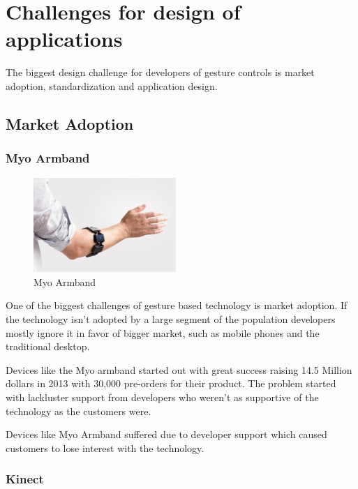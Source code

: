 \chapter{Challenges for design of applications}

The biggest design challenge for developers of gesture controls is market adoption, standardization and application design.

\section{Market Adoption}

\subsection{Myo Armband}

\begin{figure}
  \begin{center}
    \includegraphics[width=0.48\textwidth]{img/myo.jpg}
  \end{center}
  \caption{Myo Armband}
\end{figure}

One of the biggest challenges of gesture based technology is market adoption. If the technology isn't adopted by a large segment of the population developers mostly ignore it in favor of bigger market, such as mobile phones and the traditional desktop.

Devices like the Myo armband started out with great success raising 14.5 Million dollars in 2013 with 30,000 pre-orders for their product. The problem started with lackluster support from developers who weren't as supportive of the technology as the customers were. \cite{myosales}

Devices like Myo Armband suffered due to developer support which caused customers to lose interest with the technology.

\subsection{Kinect}

